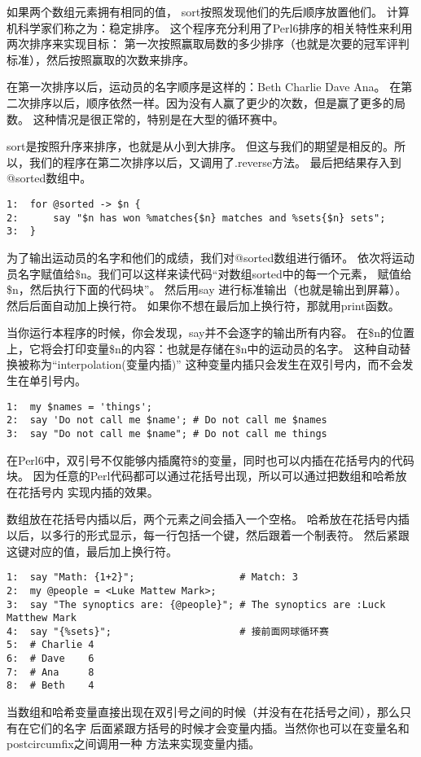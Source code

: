 \documentclass[11pt]{article}
\begin{document}
如果两个数组元素拥有相同的值， sort按照发现他们的先后顺序放置他们。
计算机科学家们称之为：稳定排序。
这个程序充分利用了Perl6排序的相关特性来利用两次排序来实现目标：
第一次按照赢取局数的多少排序（也就是次要的冠军评判标准），然后按照赢取的次数来排序。

在第一次排序以后，运动员的名字顺序是这样的：Beth Charlie Dave Ana。
在第二次排序以后，顺序依然一样。因为没有人赢了更少的次数，但是赢了更多的局数。
这种情况是很正常的，特别是在大型的循环赛中。

sort是按照升序来排序，也就是从小到大排序。
但这与我们的期望是相反的。所以，我们的程序在第二次排序以后，又调用了.reverse方法。
最后把结果存入到@sorted数组中。


\begin{verbatim}
1:  for @sorted -> $n {
2:      say "$n has won %matches{$n} matches and %sets{$n} sets";
3:  }
\end{verbatim}

为了输出运动员的名字和他们的成绩，我们对@sorted数组进行循环。
依次将运动员名字赋值给\$n。我们可以这样来读代码“对数组sorted中的每一个元素，
赋值给\$n，然后执行下面的代码块”。
然后用say 进行标准输出（也就是输出到屏幕）。
然后后面自动加上换行符。
如果你不想在最后加上换行符，那就用print函数。

当你运行本程序的时候，你会发现，say并不会逐字的输出所有内容。
在\$n的位置上，它将会打印变量\$n的内容：也就是存储在\$n中的运动员的名字。
这种自动替换被称为“interpolation(变量内插)”
这种变量内插只会发生在双引号内，而不会发生在单引号内。

\begin{verbatim}
1:  my $names = 'things';
2:  say 'Do not call me $name'; # Do not call me $names
3:  say "Do not call me $name"; # Do not call me things
\end{verbatim}
在Perl6中，双引号不仅能够内插魔符\$的变量，同时也可以内插在花括号内的代码块。
因为任意的Perl代码都可以通过花括号出现，所以可以通过把数组和哈希放在花括号内
实现内插的效果。

数组放在花括号内插以后，两个元素之间会插入一个空格。
哈希放在花括号内插以后，以多行的形式显示，每一行包括一个键，然后跟着一个制表符。
然后紧跟这键对应的值，最后加上换行符。

\begin{verbatim}
1:  say "Math: {1+2}";                  # Match: 3
2:  my @people = <Luke Mattew Mark>;
3:  say "The synoptics are: {@people}"; # The synoptics are :Luck Matthew Mark
4:  say "{%sets}";                      # 接前面网球循环赛
5:  # Charlie 4
6:  # Dave    6
7:  # Ana     8
8:  # Beth    4
\end{verbatim}
当数组和哈希变量直接出现在双引号之间的时候（并没有在花括号之间），那么只有在它们的名字
后面紧跟方括号的时候才会变量内插。当然你也可以在变量名和postcircumfix之间调用一种
方法来实现变量内插。
\end{document}
